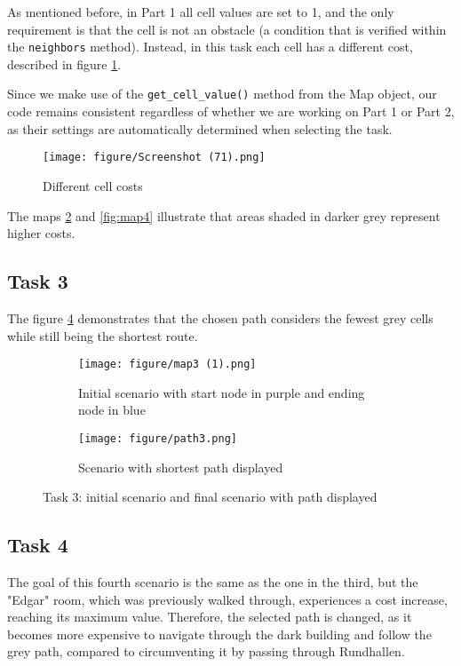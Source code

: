 \documentclass{article}
\begin{document}
 As mentioned before, in Part 1 all cell values are set to 1, and the only requirement is that the cell is not an obstacle (a condition that is verified within the \texttt{neighbors} method). 
 Instead, in this task each cell has a different cost, described in figure \ref{costs}.
 
 Since we make use of the \texttt{get\_cell\_value()} method from the Map object, our code remains consistent regardless of whether we are working on Part 1 or Part 2, as their settings are automatically determined when selecting the task.

    \begin{figure}[H]
    \centering
    \texttt{[image: figure/Screenshot (71).png]}
    \caption{Different cell costs}
    \label{costs}
    \end{figure}

The maps \ref{fig:map3} and \ref{fig:map4} illustrate that areas shaded in darker grey represent higher costs.

\subsection{Task 3}

The figure \ref{task3} demonstrates that the chosen path considers the fewest grey cells while still being the shortest route.

\begin{figure}[H]
\centering
\begin{subfigure}[b]{0.4 \textwidth}
    \texttt{[image: figure/map3 (1).png]}
    \caption{Initial scenario with start node in purple and ending node in blue}
    \label{fig:map3}
\end{subfigure}
\hfill
\begin{subfigure}{0.4\textwidth}
    \texttt{[image: figure/path3.png]}
    \caption{Scenario with shortest path displayed}
    \label{fig:path3}
\end{subfigure}
\caption{Task 3: initial scenario and final scenario with path displayed}
\label{task3}
\end{figure}

\subsection{Task 4}
The goal of this fourth scenario is the same as the one in the third, but the "Edgar" room, which was previously walked through, experiences a cost increase, reaching its maximum value.
Therefore, the selected path is changed, as it becomes more expensive to navigate through the dark building and follow the grey path, compared to circumventing it by passing through Rundhallen.
\end{document}
